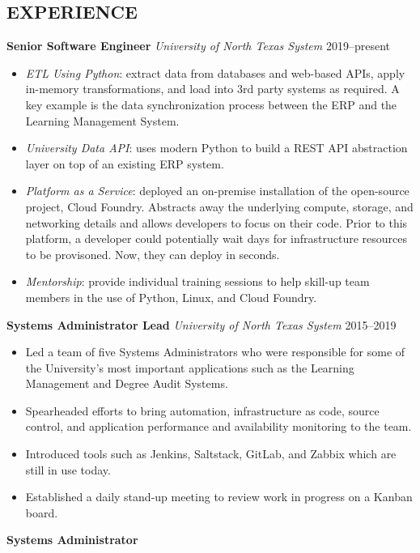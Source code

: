 \documentclass[margin,]{res}
\begin{document}
\begin{resume}
\section{EXPERIENCE} 
    \textbf{Senior Software Engineer}
    \textit{University of North Texas System} \hfill 2019--present \\ [5pt]
    \begin{itemize}[leftmargin=10pt]
        \item \textit{ETL Using Python}: extract data from databases and web-based APIs, apply in-memory transformations, and load into 3rd party systems as required. A key example is the data synchronization process between the ERP and the Learning Management System.
        \item \textit{University Data API}: uses modern Python to build a REST API abstraction layer on top of an existing ERP system.
        \item \textit{Platform as a Service}: deployed an on-premise installation of the open-source project, Cloud Foundry. Abstracts away the underlying compute, storage, and networking details and allows developers to focus on their code. Prior to this platform, a developer could potentially wait days for infrastructure resources to be provisoned. Now, they can deploy in seconds.
        \item \textit{Mentorship}: provide individual training sessions to help skill-up team members in the use of Python, Linux, and Cloud Foundry.
    \end{itemize}
    \textbf{Systems Administrator Lead}
    \textit{University of North Texas System} \hfill 2015--2019 \\ [5pt]
    \begin{itemize}[leftmargin=10pt]
        \item Led a team of five Systems Administrators who were responsible for some of the University's most important applications such as the Learning Management and Degree Audit Systems.
        \item Spearheaded efforts to bring automation, infrastructure as code, source control, and application performance and availability monitoring to the team.
        \item Introduced tools such as Jenkins, Saltstack, GitLab, and Zabbix which are still in use today.
        \item Established a daily stand-up meeting to review work in progress on a Kanban board.
    \end{itemize}
    \textbf{Systems Administrator}

\end{resume}
\end{document}
